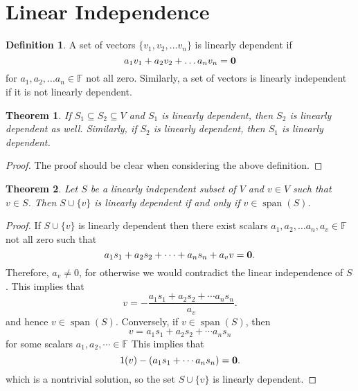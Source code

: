 \documentclass[oneside, 12pt]{book}
\DeclareMathOperator{\spn}{span}
\newtheorem{thm}{Theorem}[section]
\theoremstyle{definition}
\newtheorem{defn}{Definition}[section]
\begin{document}
\section{Linear Independence}
\begin{defn}
\label{defn_linind}
  A set of vectors $\{v_{1}, v_{2}, \dots v_{n}\}$ is linearly dependent if
  \[a_{1}v_{1}+a_{2}v_{2}+ \dots a_{n}v_{n}=\bold{0}\] for $a_{1}, a_{2}, \dots a_{n} \in \mathbb{F}$ not all zero. Similarly, a set of vectors is linearly independent if it is not linearly dependent.
\end{defn}
\begin{thm}
\label{thm_linind}
If $S_{1}\subseteq S_{2} \subseteq V$ and $S_{1}$ is linearly dependent, then $S_{2}$ is linearly dependent as well. Similarly, if $S_{2}$ is linearly dependent, then $S_{1}$ is linearly dependent.
\end{thm}
\begin{proof}
The proof should be clear when considering the above definition.
\end{proof}
\begin{thm}
\label{thm_span}
Let $S$ be a linearly independent subset of $V$ and $v \in V$ such that $v \in S$. Then $S \cup \{v\}$ is linearly dependent if and only if $v \in \spn(S)$.
\end{thm}
\begin{proof}
  If $S \cup \{v\}$ is linearly dependent then there exist scalars $a_{1}, a_{2}, \dots a_{n}, a_{v} \in \mathbb{F}$ not all zero such that \[a_{1}s_{1} +a_{2}s_{2}+\cdots +a_{n}s_{n}+a_{v}v=\bold{0}.\]
  Therefore, $a_{v}\neq0$, for otherwise we would contradict the linear independence of $S$. This implies that \[v=-\frac{a_{1}s_{1}+ a_{2}s_{2}+ \cdots a_{n}s_{n}}{a_{v}}.\] and hence $v \in \spn(S)$. Conversely, if $v \in \spn(S)$, then \[v=a_{1}s_{1}+a_{2}s_{2}+\cdots a_{n}s_{n} \] for some scalars $a_{1},a_{2}, \cdots \in \mathbb{F}$ This implies that \[1(v)-(a_{1}s_{1}+\cdots a_{n}s_{n})=\bold{0}.\] which is a nontrivial solution, so the set $S \cup \{v\}$ is linearly dependent.
\end{proof}
\end{document}
